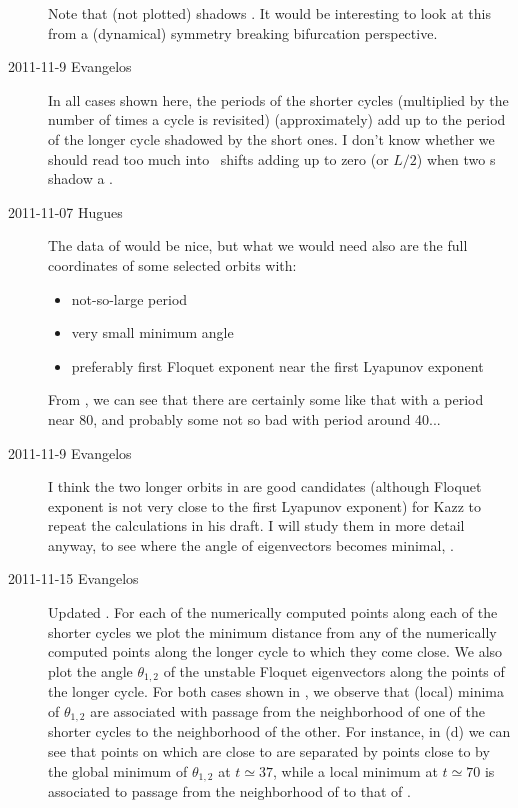 \begin{description}
Note that (not plotted) shadows . It would be interesting to look
at this from a (dynamical) symmetry breaking bifurcation perspective.

\item[2011-11-9 Evangelos]  In all cases shown here,
the periods of the shorter cycles (multiplied by the number of times a cycle is revisited)
(approximately) add up to the period of the longer cycle shadowed by the short ones.
I don't know whether we should read too much into \rpo\ shifts adding up to zero (or $L/2$)
when two \rpo s shadow a \po.

\item[2011-11-07 Hugues] The data of  would be nice,
but what we would need also are the full coordinates of some selected orbits with:
\begin{itemize}
 \item not-so-large period
 \item very small minimum angle
 \item preferably first Floquet exponent near the first Lyapunov exponent
\end{itemize}

 From , we can see that there are certainly some like
that with a period near 80, and probably some not so bad with period around 40...


\item[2011-11-9 Evangelos] I think the two longer orbits in
 are good candidates (although Floquet exponent is
not very close to the first Lyapunov exponent) for Kazz to repeat the
calculations in his draft. I will study them in more detail anyway, to
see where the angle of eigenvectors becomes minimal, \etc.

\item[2011-11-15 Evangelos] Updated . For each of
the numerically computed points along each of the shorter cycles we plot
the minimum distance from any of the numerically computed points along
the longer cycle to which they come close. We also plot the angle
$\theta_{1,2}$ of the unstable Floquet eigenvectors along the points of
the longer cycle. For both cases shown in , we
observe that (local) minima of $\theta_{1,2}$ are associated with passage
from the neighborhood of one of the shorter cycles to the neighborhood of
the other. For instance, in (d) we can see that
points on  which are close to  are separated by
points close to  by the global minimum of $\theta_{1,2}$ at
$t\simeq37$, while a local minimum at $t\simeq70$ is associated to
passage from the neighborhood of  to that of .


\end{description}
